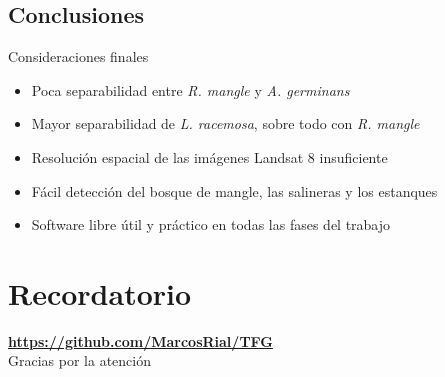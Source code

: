 \documentclass[12pt]{beamer}
\begin{document}
\subsection{Conclusiones}
\begin{frame}
	\begin{block}{Consideraciones finales}
		\begin{itemize}[<+->]
			\item Poca separabilidad entre \textit{R. mangle} y \textit{A. germinans}
			\item Mayor separabilidad de \textit{L. racemosa}, sobre todo con \textit{R. mangle}
			\item Resolución espacial de las imágenes Landsat 8 insuficiente
			\item Fácil detección del bosque de mangle, las salineras y los estanques
			\item Software libre útil y práctico en todas las fases del trabajo
		\end{itemize}
	\end{block}
\end{frame}

\appendix
\section{Recordatorio}
\begin{frame}
	\centering
	{\large \textbf{{\color{blue} \url{https://github.com/MarcosRial/TFG}}}}\\ \vspace*{2cm}
	Gracias por la atención
\end{frame}
\end{document}
